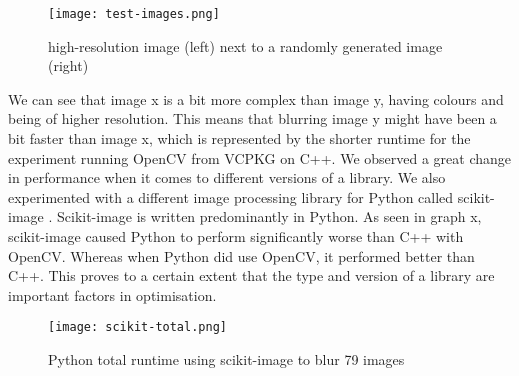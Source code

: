 \begin{figure}[H]
	\centering
	\texttt{[image: test-images.png]}
	\caption{high-resolution image (left) next to a randomly generated image (right)}
	\label{figure:test-images}
\end{figure}

We can see that image x is a bit more complex than image y, having colours and being of higher resolution. This means that blurring image y might have been a bit faster than image x, which is represented by the shorter runtime for the experiment running OpenCV from VCPKG on C++.
We observed a great change in performance when it comes to different versions of a library. We also experimented with a different image processing library for Python called scikit-image \cite{scikit}. Scikit-image is written predominantly in Python. As seen in graph x, scikit-image caused Python to perform significantly worse than C++ with OpenCV. Whereas when Python did use OpenCV, it performed better than C++. This proves to a certain extent that the type and version of a library are important factors in optimisation.

\begin{figure}[H]
	\centering
	\texttt{[image: scikit-total.png]}
	\caption{Python total runtime using scikit-image to blur 79 images}
	\label{figure:scikit-total}
\end{figure}

